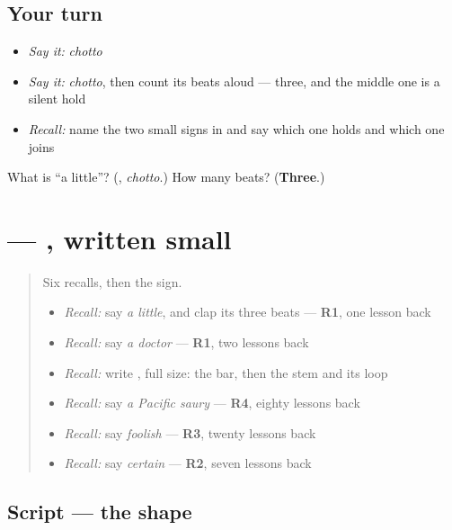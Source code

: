 \subsection*{Your turn}
\begin{itemize}
\raggedright
  \item \emph{Say it:} \emph{chotto}
  \item \emph{Say it:} \emph{chotto}, then count its beats aloud — three, and the middle one is a silent hold
  \item \emph{Recall:} name the two small signs in \textbf{} and say which one holds and which one joins
\end{itemize}

\begin{tcolorbox}[breakable,colback=teal!4,colframe=teal!35!black,title={Before you move on}]
What is \textquotedblleft{}a little\textquotedblright{}? (\textbf{}, \emph{chotto}.) How many beats? (\textbf{Three}.)
\end{tcolorbox}
\section[\texorpdfstring{\ja{ょ} (small yo)}{ょ (small yo)}]{ — , written small}

\label{lesson:JA-W131-small-yo}



\begin{quote}
Six recalls, then the sign.

\begin{itemize}
\raggedright
  \item \emph{Recall:} say \emph{a little}, and clap its three beats — \textbf{R1}, one lesson back
  \item \emph{Recall:} say \emph{a doctor} — \textbf{R1}, two lessons back
  \item \emph{Recall:} write \textbf{}, full size: the bar, then the stem and its loop
  \item \emph{Recall:} say \emph{a Pacific saury} — \textbf{R4}, eighty lessons back
  \item \emph{Recall:} say \emph{foolish} — \textbf{R3}, twenty lessons back
  \item \emph{Recall:} say \emph{certain} — \textbf{R2}, seven lessons back
\end{itemize}
\end{quote}

\subsection*{Script — the shape}

